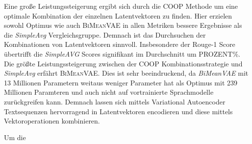 Eine große Leistungssteigerung ergibt sich durch die COOP Methode um eine optimale Kombination der einzelnen Latentvektoren zu finden.
Hier erzielen sowohl Optimus wie auch \textsc{BiMeanVAE} in allen Metriken bessere Ergebnisse als die \textit{SimpleAvg} Vergleichsgruppe.
Demnach ist das Durchsuchen der Kombinationen von Latentvektoren sinnvoll. 
Insbesondere der Rouge-1 Score übertrifft die \textit{SimpleAVG} Scores signifikant im Durchschnitt um PROZENT\%.
Die größte Leistungssteigerung zwischen der COOP Kombinationsstrategie und \textit{SimpleAvg} erfährt \textsc{BiMeanVAE}.
Dies ist sehr beeindruckend, da \textit{BiMeanVAE} mit 13 Millionen Parametern weitaus weniger Parameter hat als Optimus mit 239 Millionen Paramteren und auch nicht auf vortrainierte Sprachmodelle zurückgreifen kann.
Demnach lassen sich mittels Variational Autoencoder Textsequenzen hervorragend in Latentvektoren encodieren und diese mittels Vektoroperationen kombinieren.


Um die 




\pagebreak
